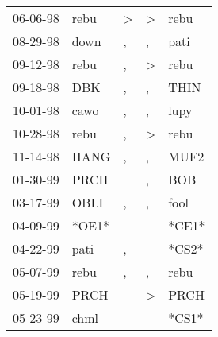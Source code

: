 \begin{supertabular}{p{0.07\textwidth}p{0.06\textwidth}p{0.02\textwidth}p{0.02\textwidth}p{0.06\textwidth}}
          06-06-98\textsuperscript{} &           rebu\textsuperscript{} &     \textgreater &     \textgreater &           rebu\textsuperscript{} \\
          08-29-98\textsuperscript{} &           down\textsuperscript{} &                , &                , &           pati\textsuperscript{} \\
          09-12-98\textsuperscript{} &           rebu\textsuperscript{} &                , &     \textgreater &           rebu\textsuperscript{} \\
          09-18-98\textsuperscript{} &            DBK\textsuperscript{} &                , &                , &           THIN\textsuperscript{} \\
          10-01-98\textsuperscript{} &           cawo\textsuperscript{} &                , &                , &           lupy\textsuperscript{} \\
          10-28-98\textsuperscript{} &           rebu\textsuperscript{} &                , &     \textgreater &           rebu\textsuperscript{} \\
          11-14-98\textsuperscript{} &           HANG\textsuperscript{} &                , &                , &           MUF2\textsuperscript{} \\
          01-30-99\textsuperscript{} &           PRCH\textsuperscript{} &                  &                , &            BOB\textsuperscript{} \\
          03-17-99\textsuperscript{} &           OBLI\textsuperscript{} &                , &                , &           fool\textsuperscript{} \\
          04-09-99\textsuperscript{} &                            *OE1* &                  &                  &                            *CE1* \\
          04-22-99\textsuperscript{} &           pati\textsuperscript{} &                , &                  &                            *CS2* \\
          05-07-99\textsuperscript{} &           rebu\textsuperscript{} &                , &                , &           rebu\textsuperscript{} \\
          05-19-99\textsuperscript{} &           PRCH\textsuperscript{} &                  &     \textgreater &           PRCH\textsuperscript{} \\
          05-23-99\textsuperscript{} &           chml\textsuperscript{} &                  &                  &                            *CS1* \\

\end{supertabular}
